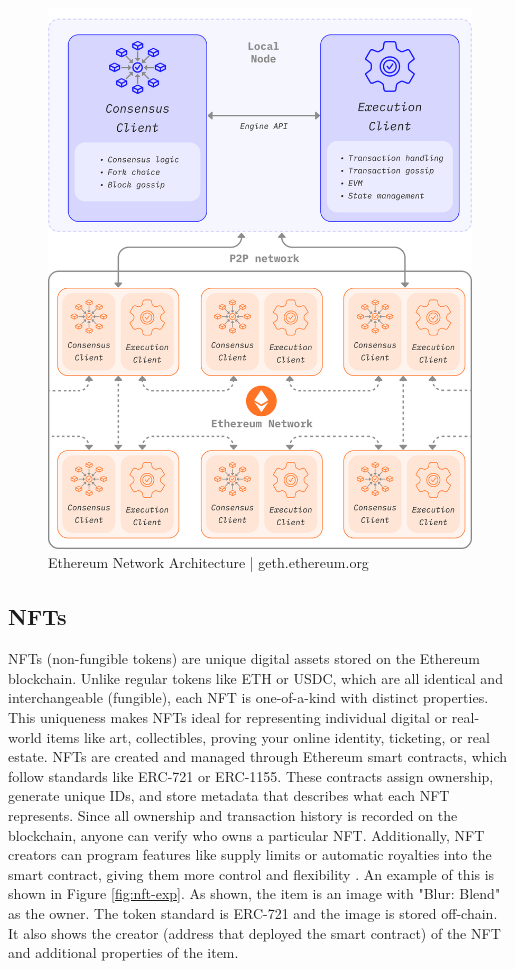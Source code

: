 \documentclass[conference]{IEEEtran}
\begin{document}
\begin{figure}[h!]
    \centering
    \includegraphics[width=0.9\linewidth]{consensus-execution.png}
    \caption{Ethereum Network Architecture | geth.ethereum.org}
    \label{fig:con-exe}
\end{figure}

\subsection{NFTs}
NFTs (non-fungible tokens) are unique digital assets stored on the Ethereum blockchain. Unlike regular tokens like ETH or USDC, which are all identical and interchangeable (fungible), each NFT is one-of-a-kind with distinct properties. This uniqueness makes NFTs ideal for representing individual digital or real-world items like art, collectibles, proving your online identity, ticketing, or real estate. NFTs are created and managed through Ethereum smart contracts, which follow standards like ERC-721 or ERC-1155. These contracts assign ownership, generate unique IDs, and store metadata that describes what each NFT represents. Since all ownership and transaction history is recorded on the blockchain, anyone can verify who owns a particular NFT. Additionally, NFT creators can program features like supply limits or automatic royalties into the smart contract, giving them more control and flexibility \cite{what-is-nft}. An example of this is shown in Figure \ref{fig:nft-exp}. As shown, the item is an image with "Blur: Blend" as the owner. The token standard is ERC-721 and the image is stored off-chain. It also shows the creator (address that deployed the smart contract) of the NFT and additional properties of the item. 
\end{document}
